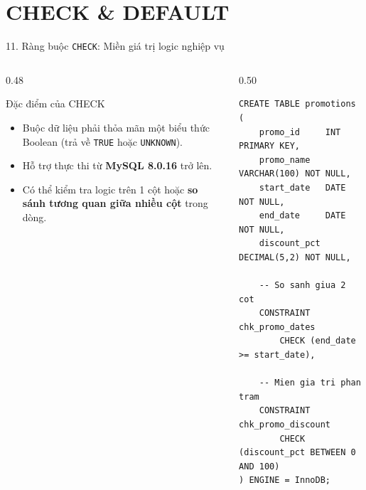 \documentclass[aspectratio=169,11pt]{beamer}
\newcommand{\kw}[1]{\textcolor{dbblue}{\textbf{#1}}}
\begin{document}
\section{CHECK \& DEFAULT}
\begin{frame}[fragile]{11. Ràng buộc \texttt{CHECK}: Miền giá trị logic nghiệp vụ}
\begin{columns}[t]
  \begin{column}{0.48\textwidth}
    \begin{block}{Đặc điểm của CHECK}
      \begin{itemize}\setlength{\itemsep}{1.5pt}
        \item Buộc dữ liệu phải thỏa mãn một biểu thức Boolean (trả về \texttt{TRUE} hoặc \texttt{UNKNOWN}).
        \item Hỗ trợ thực thi từ \kw{MySQL 8.0.16} trở lên.
        \item Có thể kiểm tra logic trên 1 cột hoặc \kw{so sánh tương quan giữa nhiều cột} trong dòng.
      \end{itemize}
    \end{block}
  \end{column}
  \begin{column}{0.50\textwidth}
\begin{lstlisting}
CREATE TABLE promotions (
    promo_id     INT PRIMARY KEY,
    promo_name   VARCHAR(100) NOT NULL,
    start_date   DATE NOT NULL,
    end_date     DATE NOT NULL,
    discount_pct DECIMAL(5,2) NOT NULL,
    
    -- So sanh giua 2 cot
    CONSTRAINT chk_promo_dates
        CHECK (end_date >= start_date),
        
    -- Mien gia tri phan tram
    CONSTRAINT chk_promo_discount
        CHECK (discount_pct BETWEEN 0 AND 100)
) ENGINE = InnoDB;
\end{lstlisting}
  \end{column}
\end{columns}
\end{frame}
\end{document}
